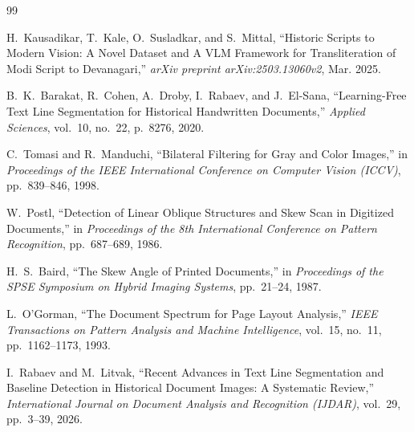 \documentclass[12pt, a4paper]{article}
\begin{document}
\begin{thebibliography}{99}

H.~Kausadikar, T.~Kale, O.~Susladkar, and S.~Mittal,
``Historic Scripts to Modern Vision: A Novel Dataset and A VLM Framework for Transliteration of Modi Script to Devanagari,''
\emph{arXiv preprint arXiv:2503.13060v2}, Mar. 2025.

B.~K.~Barakat, R.~Cohen, A.~Droby, I.~Rabaev, and J.~El-Sana,
``Learning-Free Text Line Segmentation for Historical Handwritten Documents,''
\emph{Applied Sciences}, vol.~10, no.~22, p.~8276, 2020.

C.~Tomasi and R.~Manduchi,
``Bilateral Filtering for Gray and Color Images,''
in \emph{Proceedings of the IEEE International Conference on Computer Vision (ICCV)}, pp.~839--846, 1998.

W.~Postl,
``Detection of Linear Oblique Structures and Skew Scan in Digitized Documents,''
in \emph{Proceedings of the 8th International Conference on Pattern Recognition}, pp.~687--689, 1986.

H.~S.~Baird,
``The Skew Angle of Printed Documents,''
in \emph{Proceedings of the SPSE Symposium on Hybrid Imaging Systems}, pp.~21--24, 1987.

L.~O'Gorman,
``The Document Spectrum for Page Layout Analysis,''
\emph{IEEE Transactions on Pattern Analysis and Machine Intelligence}, vol.~15, no.~11, pp.~1162--1173, 1993.

I.~Rabaev and M.~Litvak,
``Recent Advances in Text Line Segmentation and Baseline Detection in Historical Document Images: A Systematic Review,''
\emph{International Journal on Document Analysis and Recognition (IJDAR)}, vol.~29, pp.~3--39, 2026.

\end{thebibliography}
\end{document}
